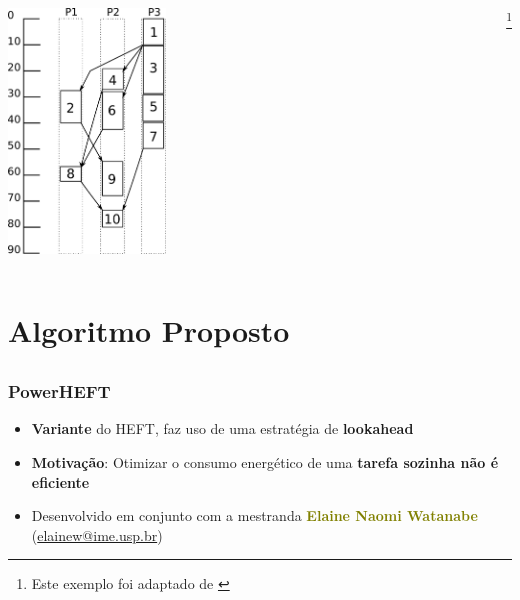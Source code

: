\documentclass{beamer}
\newcommand{\colorize}[2]{\textbf{\textcolor{#1}{#2}}}
\begin{document}
\begin{frame}
\begin{columns}[c]
	\begin{column}[c]{.4\textwidth} %
		\includegraphics[height=6.5cm]{escalonamento_heft.pdf}
	\end{column}
	
	\footnote{Este exemplo foi adaptado de \cite{topcoglu:heft}}
\end{columns}
\end{frame}



\section{Algoritmo Proposto}
\subsection{}

\begin{frame}
\frametitle{PowerHEFT}
\begin{itemize}
	\item \colorize{n_orange}{Variante} do HEFT, faz uso de uma estratégia de \colorize{n_blue}{lookahead}
	\item \colorize{n_green}{Motivação}: Otimizar o consumo energético de uma
		\colorize{RawSienna}{tarefa sozinha não é eficiente}
	\item Desenvolvido em conjunto com a mestranda \colorize{olive}{Elaine Naomi Watanabe}
	(\url{elainew@ime.usp.br})
\end{itemize}

\end{frame}
\end{document}
